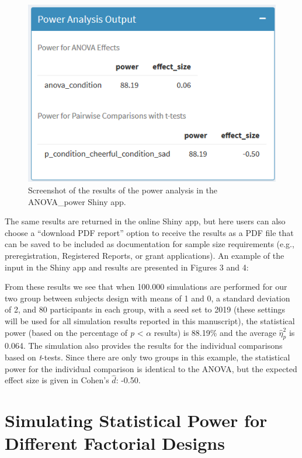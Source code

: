 \documentclass[
  english,
  ,jou,floatsintext]{apa6}
\begin{document}
\begin{figure}
\centering
\includegraphics{screenshots/anova_power_result.png}
\caption{Screenshot of the results of the power analysis in the ANOVA\_power Shiny app.}
\end{figure}

The same results are returned in the online Shiny app, but here users can also choose a \enquote{download PDF report} option to receive the results as a PDF file that can be saved to be included as documentation for sample size requirements (e.g., preregistration, Registered Reports, or grant applications).
An example of the input in the Shiny app and results are presented in Figures 3 and 4:

From these results we see that when 100.000 simulations are performed for our two group between subjects design with means of 1 and 0, a standard deviation of 2, and 80 participants in each group, with a seed set to 2019 (these settings will be used for all simulation results reported in this manuscript), the statistical power (based on the percentage of \emph{p} \textless{} \(\alpha\) results) is 88.19\% and the average \(\hat\eta_p^2\) is 0.064.
The simulation also provides the results for the individual comparisons based on \emph{t}-tests.
Since there are only two groups in this example, the statistical power for the individual comparison is identical to the ANOVA, but the expected effect size is given in Cohen's \(\hat{d}\): -0.50.

\hypertarget{simulating-statistical-power-for-different-factorial-designs}{%
\section{Simulating Statistical Power for Different Factorial Designs}\label{simulating-statistical-power-for-different-factorial-designs}}
\end{document}
